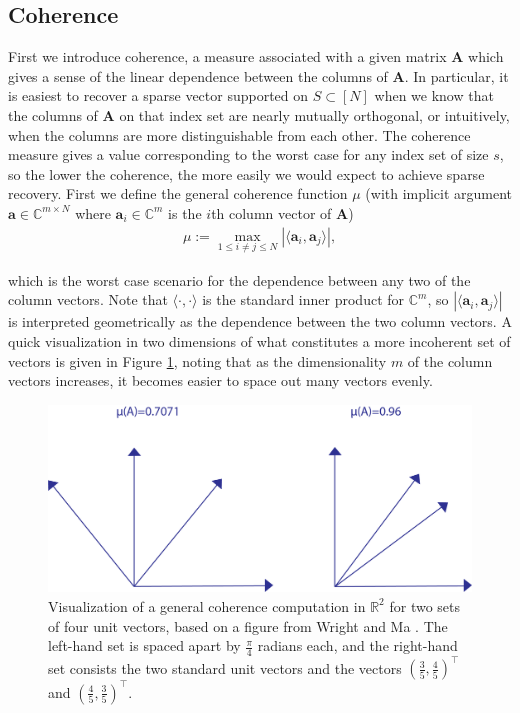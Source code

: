 \documentclass[12pt,a4paper]{amsart}
\numberwithin{equation}{section}
\theoremstyle{plain}
\theoremstyle{definition}
\newcommand{\BR}{\mathbb R}
\newcommand{\BC}{\mathbb C}
\newcommand{\bda}{\mathbf{a}}
\newcommand{\bdA}{\mathbf{A}}
\begin{document}
\subsection{Coherence}\label{coh-section}

First we introduce coherence, a measure associated with a given matrix $\bdA$ which gives a sense of the linear dependence between the columns of $\bdA$. In particular, it is easiest to recover a sparse vector supported on $S\subset[N]$ when we know that the columns of $\bdA$ on that index set are nearly mutually orthogonal, or intuitively, when the columns are more distinguishable from each other. The coherence measure gives a value corresponding to the worst case for any index set of size $s$, so the lower the coherence, the more easily we would expect to achieve sparse recovery. First we define the general coherence function $\mu$ (with implicit argument $\bda\in\BC^{m\times N}$ where $\bda_i\in\BC^m$ is the $i$th column vector of $\bdA$)
\begin{align}
    \mu:=\max_{1\leq i\neq j\leq N}|\langle\bda_i,\bda_j\rangle|,
\end{align}

which is the worst case scenario for the dependence between any two of the column vectors. Note that $\langle\cdot,\cdot\rangle$ is the standard inner product for $\BC^m$, so $|\langle\bda_i,\bda_j\rangle|$ is interpreted geometrically as the dependence between the two column vectors. A quick visualization in two dimensions of what constitutes a more incoherent set of vectors is given in Figure \ref{coh-vis}, noting that as the dimensionality $m$ of the column vectors increases, it becomes easier to space out many vectors evenly.

\begin{figure}
    \centering
    \includegraphics[scale = 0.7]{coherence_illustration_final.png}
    \caption{Visualization of a general coherence computation in $\BR^2$ for two sets of four unit vectors, based on a figure from Wright and Ma \cite{wm}. The left-hand set is spaced apart by $\frac{\pi}{4}$ radians each, and the right-hand set consists the two standard unit vectors and the vectors $(\frac{3}{5},\frac{4}{5})^\top$ and $(\frac{4}{5},\frac{3}{5})^\top$.}
    \label{coh-vis}
\end{figure}
\end{document}
